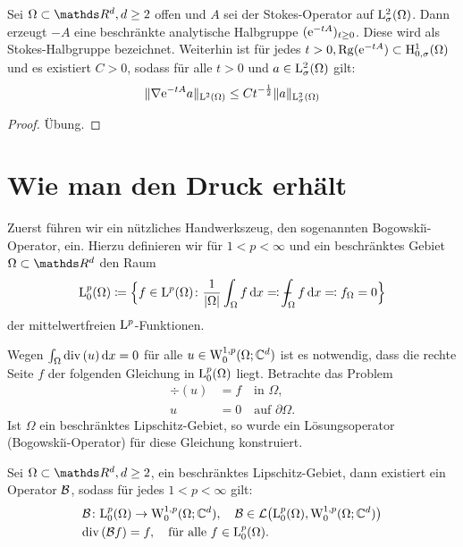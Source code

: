 \begin{thm}
  Sei $\Omega \subset \R^d, d \geq 2$ offen und $A$ sei der Stokes-Operator auf $\mathrm{L}^2_\sigma(\Omega)$.
  Dann erzeugt $-A$ eine beschränkte analytische Halbgruppe $(\mathrm{e}^{-tA})_{t \geq 0}$.
  Diese wird als Stokes-Halbgruppe bezeichnet.
  Weiterhin ist für jedes $t > 0, \operatorname{Rg}(\mathrm{e}^{-tA}) \subset \mathrm{H}_{0,\sigma}^1(\Omega)$ und es existiert $C > 0$, sodass für alle $t > 0$ und $a \in \mathrm{L}_\sigma^2(\Omega)$ gilt:
  $$
  \|\nabla \mathrm{e}^{-tA} a \|_{\mathrm{L}^2(\Omega)} \leq C t^{-\frac{1}{2}} \|a\|_{\mathrm{L}_\sigma^2(\Omega)}
  $$
\end{thm}

\begin{proof}
  Übung.
\end{proof}

\section{Wie man den Druck erhält}

Zuerst führen wir ein nützliches Handwerkszeug, den sogenannten Bogowski\u{\i}-Operator, ein.
Hierzu definieren wir für $1 < p < \infty$ und ein beschränktes Gebiet $\Omega \subset \R^d$ den Raum
$$
\Ell^p_0(\Omega) \coloneqq \Big\{ f \in \Ell^p(\Omega) \colon \frac{1}{|\Omega|} \int_\Omega f \d x \eqqcolon \dashint_\Omega f \d x \eqqcolon f_\Omega = 0 \Big\}
$$
der mittelwertfreien $\mathrm{L}^p$-Funktionen.

Wegen $\int_\Omega \mathrm{div\,} (u) \, {\operatorname{d}\!{x}} = 0$ für alle $u \in \mathrm{W}_0^{1,p}(\Omega; \mathbb{C}^d)$ ist es notwendig, dass die rechte Seite $f$ der folgenden Gleichung in $\mathrm{L}^p_0(\Omega)$ liegt.
Betrachte das Problem
\begin{align*}
  \div(u) &= f \quad\text{in } \Omega, \\
  u &= 0 \quad\text{auf } \partial \Omega.
\end{align*}
Ist $\Omega$ ein beschränktes Lipschitz-Gebiet, so wurde ein Lösungsoperator (Bogowski\u{\i}-Operator) für diese Gleichung konstruiert.

\begin{thm}
  \label{thm:bogowskii}
  Sei $\Omega \subset \R^d, d \geq 2$, ein beschränktes Lipschitz-Gebiet, dann existiert ein Operator $\mathcal{B}$, sodass für jedes $1 < p < \infty$ gilt:
  \begin{align*}
    &\mathcal{B} \colon \mathrm{L}_0^p(\Omega) \to \mathrm{W}_0^{1,p}(\Omega; \mathbb{C}^d), \quad \mathcal{B} \in \mathcal{L}\big(\mathrm{L}_0^p(\Omega), \mathrm{W}_0^{1,p}(\Omega; \mathbb{C}^d)\big) \\
    &\mathrm{div\,} (\mathcal{B} f) = f, \quad\text{für alle } f \in \mathrm{L}_0^p(\Omega).
  \end{align*}
\end{thm}

